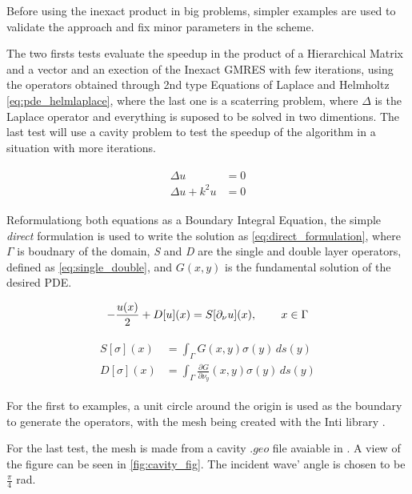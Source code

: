 Before using the inexact product in big problems, simpler examples are used to validate the approach and fix minor parameters in the scheme.

The two firsts tests evaluate the speedup in the product of a Hierarchical Matrix and a vector and an exection of the Inexact GMRES with few iterations, using the operators obtained through 2nd type Equations of Laplace and Helmholtz \ref{eq:pde_helmlaplace}, where the last one is a scaterring problem, where $\Delta$ is the Laplace operator and everything is suposed to be solved in two dimentions. The last test will use a cavity problem to test the speedup of the algorithm in a situation with more iterations.

\begin{align}\label{eq:pde_helmlaplace}
    \begin{split}
        \Delta u &= 0 \\
        \Delta u + k^{2}u &= 0
    \end{split}
\end{align}

Reformulationg both equations as a Boundary Integral Equation, the simple \textit{direct} formulation is used to write the solution as \ref{eq:direct_formulation}, where $\Gamma$ is boudnary of the domain, \textit{S} and \textit{D} are the single and double layer operators, defined as \ref{eq:single_double}, and $G(x,y)$ is the fundamental solution of the desired PDE.

\begin{equation}\label{eq:direct_formulation}
    -\frac{u(x)}{2} + D[u](x) = S[\partial_{\nu }u] (x), \hspace{0.3in} x \in \Gamma
\end{equation}

\begin{align}\label{eq:single_double}
    \begin{split}
        S[\sigma](x) &= \int_{\Gamma} G(x,y) \sigma(y)  \,ds(y) \\
        D[\sigma](x) &= \int_{\Gamma} \frac{\partial G}{\partial \nu_{y}}(x,y) \sigma(y)  \,ds(y)
    \end{split}
\end{align}

For the first to examples, a unit circle around the origin is used as the boundary to generate the operators, with the mesh being created with the Inti library \cite{git-inti}. 

For the last test, the mesh is made from a cavity $.geo$ file avaiable in \cite{git_dudu}. A view of the figure can be seen in \ref{fig:cavity_fig}. The incident wave' angle is chosen to be $\frac{\pi}{4}$ rad.

